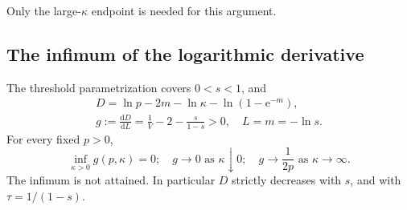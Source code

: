 Only the large-\(\kappa\) endpoint is needed for this argument.

\subsection{The infimum of the logarithmic derivative}

\begin{proposition}\label{prop:exact-P5} The threshold parametrization covers \(0<s<1\), and
\begin{equation}
\begin{gathered}
 D=\ln p-2m-\ln\kappa-\ln(1-\mathrm{e}^{-m}),\\
 g:=\frac{\mathrm{d}D}{\mathrm{d}L}=\frac1V-2-\frac{s}{1-s}>0,
 \quad L=m=-\ln s.                                  \label{eq:exact-P15}
\end{gathered}
\end{equation}
For every fixed \(p>0\),
\begin{equation}
 \inf_{\kappa>0}g(p,\kappa)=0;
 \quad g\to0\text{ as }\kappa\downarrow0;
 \quad g\to\frac1{2p}\text{ as }\kappa\to\infty.       \label{eq:exact-P16}
\end{equation}
The infimum is not attained. In particular \(D\) strictly decreases with \(s\), and with \(\tau=1/(1-s)\).

\end{proposition}
